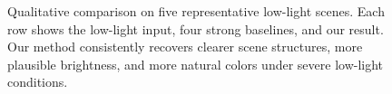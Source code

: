 \begin{figure}[!t]
\begin{minipage}[c]{\FigThreeSceneW}
    \centering
\end{minipage}\hspace{\FigThreeGap}%
\begin{minipage}[c]{\FigThreeColW}
    \centering
\end{minipage}\hspace{\FigThreeGap}%
\begin{minipage}[c]{\FigThreeColW}
    \centering
\end{minipage}\hspace{\FigThreeGap}%
\begin{minipage}[c]{\FigThreeColW}
    \centering
\end{minipage}\hspace{\FigThreeGap}%
\begin{minipage}[c]{\FigThreeColW}
    \centering
\end{minipage}\hspace{\FigThreeGap}%
\begin{minipage}[c]{\FigThreeColW}
    \centering
\end{minipage}\hspace{\FigThreeGap}%
\begin{minipage}[c]{\FigThreeColW}
    \centering
\end{minipage}

\vspace{-0.55em}
\caption{Qualitative comparison on five representative low-light scenes.
Each row shows the low-light input, four strong baselines, and our result.
Our method consistently recovers clearer scene structures, more plausible
brightness, and more natural colors under severe low-light conditions.}
\label{fig:qualitative_results}
\end{figure}
